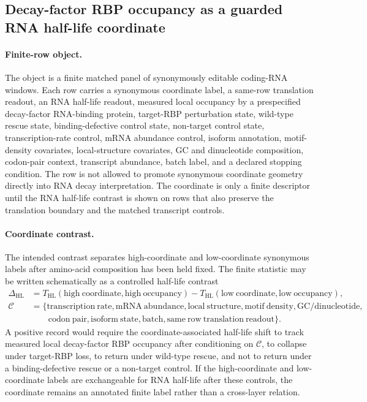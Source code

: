 \subsection{Decay-factor RBP occupancy as a guarded RNA half-life coordinate}
\label{sec:decay-factor-rbp-rna-half-life-with-translation-boundary-cross-layer}

\paragraph{Finite-row object.}
The object is a finite matched panel of synonymously editable coding-RNA windows.  Each row carries a synonymous coordinate label, a same-row translation readout, an RNA half-life readout, measured local occupancy by a prespecified decay-factor RNA-binding protein, target-RBP perturbation state, wild-type rescue state, binding-defective control state, non-target control state, transcription-rate control, mRNA abundance control, isoform annotation, motif-density covariates, local-structure covariates, GC and dinucleotide composition, codon-pair context, transcript abundance, batch label, and a declared stopping condition.  The row is not allowed to promote synonymous coordinate geometry directly into RNA decay interpretation.  The coordinate is only a finite descriptor until the RNA half-life contrast is shown on rows that also preserve the translation boundary and the matched transcript controls.

\paragraph{Coordinate contrast.}
The intended contrast separates high-coordinate and low-coordinate synonymous labels after amino-acid composition has been held fixed.  The finite statistic may be written schematically as a controlled half-life contrast
$$
\begin{aligned}
\Delta_{\mathrm{HL}}
  &= T_{\mathrm{HL}}(\mathrm{high\ coordinate},\mathrm{high\ occupancy})
   - T_{\mathrm{HL}}(\mathrm{low\ coordinate},\mathrm{low\ occupancy}),\\
\mathcal{C}
  &= \{\mathrm{transcription\ rate},\mathrm{mRNA\ abundance},\mathrm{local\ structure},
      \mathrm{motif\ density},\mathrm{GC/dinucleotide},\\
  &\qquad \mathrm{codon\ pair},\mathrm{isoform\ state},\mathrm{batch},\mathrm{same\ row\ translation\ readout}\}.
\end{aligned}
$$
A positive record would require the coordinate-associated half-life shift to track measured local decay-factor RBP occupancy after conditioning on $\mathcal{C}$, to collapse under target-RBP loss, to return under wild-type rescue, and not to return under a binding-defective rescue or a non-target control.  If the high-coordinate and low-coordinate labels are exchangeable for RNA half-life after these controls, the coordinate remains an annotated finite label rather than a cross-layer relation.

